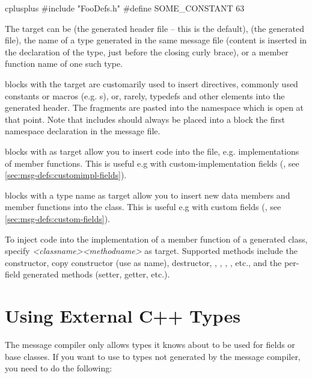 \begin{msg}
cplusplus {{
#include "FooDefs.h"
#define SOME_CONSTANT 63
}}
\end{msg}

The target can be  (the generated header file -- this is the default),
 (the generated  file), the name of a type generated in the
same message file (content is inserted in the declaration of the type, just
before the closing curly brace), or a member function name of one such type.

 blocks with the target  are customarily used to
insert  directives, commonly used constants or macros (e.g.
s), or, rarely, typedefs and other elements into the generated
header. The fragments are pasted into the namespace which is open at that point.
Note that includes should always be placed into a  block
 the first namespace declaration in the message file.

 blocks with  as target allow you to insert code
into the  file, e.g. implementations of member functions. This is
useful e.g with custom-implementation fields (, see
\ref{sec:msg-defs:customimpl-fields}).

 blocks with a type name as target allow you to insert new
data members and member functions into the class. This is useful e.g with custom
fields (, see \ref{sec:msg-defs:custom-fields}).

To inject code into the implementation of a member function of a generated
class, specify \textit{<classname>}\ttt{::}\textit{<methodname>} as target.
Supported methods include the constructor, copy constructor (use  as
name), destructor, , , ,
, etc., and the per-field generated methods (setter, getter,
etc.).



\section{Using External C++ Types}
\label{sec:msg-defs:using-cpp-types}
\label{sec:msg-defs:announcing-types} %

The message compiler only allows types it knows about to be used for fields or
base classes. If you want to use to types not generated by the message compiler,
you need to do the following:

